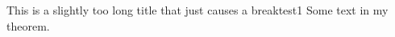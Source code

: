 \documentclass{article}
\begin{document}
\begin{theorem}{This is a slightly too long title that just causes a break}{test1}
  Some text in my theorem.
\end{theorem}
\end{document}
